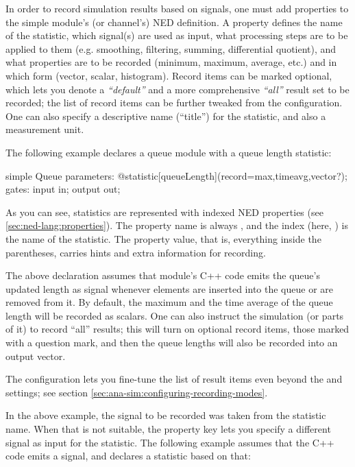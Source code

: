 In order to record simulation results based on signals, one must add
 properties to the simple module's (or channel's) NED
definition. A  property defines the name of the
statistic, which signal(s) are used as input, what processing steps are to
be applied to them (e.g. smoothing, filtering, summing, differential
quotient), and what properties are to be recorded (minimum, maximum,
average, etc.) and in which form (vector, scalar, histogram). Record items
can be marked optional, which lets you denote a \textit{``default''} and a
more comprehensive \textit{``all''} result set to be recorded; the list of
record items can be further tweaked from the configuration. One can also
specify a descriptive name (``title'') for the statistic, and also a
measurement unit.

The following example declares a queue module with a queue length statistic:

\begin{ned}
simple Queue
{
    parameters:
        @statistic[queueLength](record=max,timeavg,vector?);
    gates:
        input in;
        output out;
}
\end{ned}

As you can see, statistics are represented with indexed NED properties (see
\ref{sec:ned-lang:properties}). The property name is always
, and the index (here, ) is the
name of the statistic. The property value, that is, everything inside the
parentheses, carries hints and extra information for recording.

The above  declaration assumes that module's C++ code
emits the queue's updated length as signal  whenever
elements are inserted into the queue or are removed from it.
By default, the maximum and the time average of the queue length will
be recorded as scalars. One can also instruct the simulation (or parts
of it) to record ``all'' results; this will turn on optional record items,
those marked with a question mark, and then the queue lengths will also be
recorded into an output vector.

\begin{note}
The configuration lets you fine-tune the list of result items even
beyond the  and  settings; see section
\ref{sec:ana-sim:configuring-recording-modes}.
\end{note}

In the above example, the signal to be recorded was taken from the
statistic name. When that is not suitable, the  property key
lets you specify a different signal as input for the statistic. The
following example assumes that the C++ code emits a  signal, and
declares a  statistic based on that:

